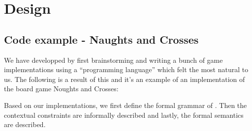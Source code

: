 \chapter{Design}
\label{chap:design}

\section{Code example - Naughts and Crosses}

We have developped \productname{} by first brainstorming and writing a bunch of game implementations
using a ``programming language'' which felt the most natural to us. The following is a result of this 
and it's an example of an implementation of the board game Noughts and Crosses:


Based on our implementations, we first define the formal grammar of
\productname{}. Then the contextual constraints are informally described and 
lastly, the formal semantics are described.










